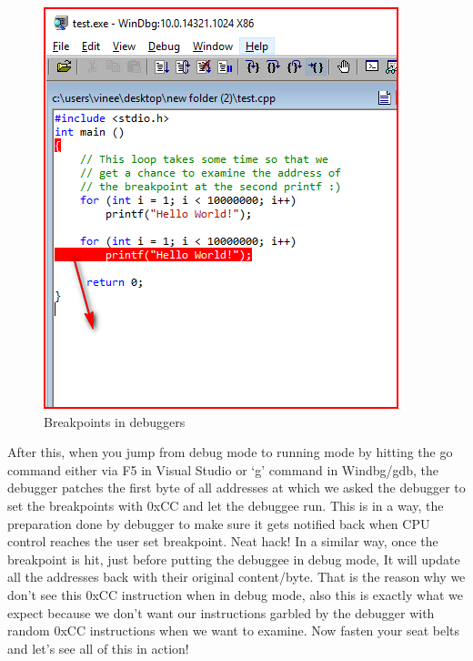\documentclass{article}
\begin{document}
\begin{figure}[H]
\centering
\includegraphics[width=\textwidth]{2.Breakpoints-in-Debuggers.png}
\caption{Breakpoints in debuggers}
\end{figure}

After this, when you jump from debug mode to running mode by hitting the go command either via F5 in Visual Studio or ‘g’ command in Windbg/gdb, the debugger patches the first byte of all addresses at which we asked the debugger to set the breakpoints with 0xCC and let the debuggee run. This is in a way, the preparation done by debugger to make sure it gets notified back when CPU control reaches the user set breakpoint. Neat hack! In a similar way, once the breakpoint is hit, just before putting the debuggee in debug mode, It will update all the addresses back with their original content/byte. That is the reason why we don’t see this 0xCC instruction when in debug mode, also this is exactly what we expect because we don’t want our instructions garbled by the debugger with random 0xCC instructions when we want to examine. Now fasten your seat belts and let’s see all of this in action!
\end{document}
